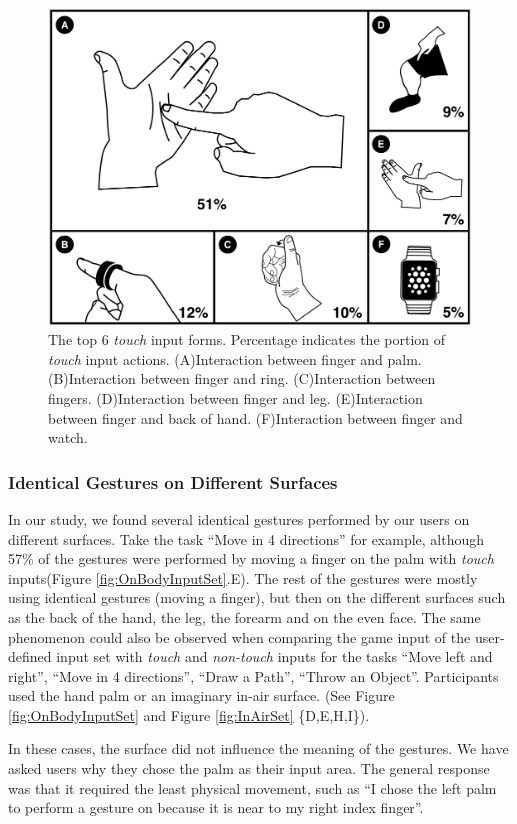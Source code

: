 \documentclass{sigchi}
\begin{document}
\begin{figure}[!t]
    \centering
    \includegraphics[width=0.8\columnwidth]{OnBodyForms.pdf}
    \caption{The top 6 \emph{touch} input forms. Percentage indicates the portion of \emph{touch} input actions. (A)Interaction between finger and palm. (B)Interaction between finger and ring. (C)Interaction between fingers. (D)Interaction between finger and leg. (E)Interaction between finger and back of hand. (F)Interaction between finger and watch.}
    \label{fig:figureOnBodyPorpotion}
    \end{figure}   

\subsubsection{Identical Gestures on Different Surfaces}
 In our study, we found several identical gestures performed by our users on different surfaces. Take the task ``Move in 4 directions'' for example, although 57\% of the gestures were performed by moving a finger on the palm with \emph{touch} inputs(Figure \ref{fig:OnBodyInputSet}.E). The rest of the gestures were mostly using identical gestures (moving a finger), but then on the different surfaces such as the back of the hand, the leg, the forearm and on the even face. The same phenomenon could also be observed when comparing the game input of the user-defined input set with \emph{touch} and \emph{non-touch} inputs for the tasks ``Move left and right'', ``Move in 4 directions'', ``Draw a Path'', ``Throw an Object''. Participants used the hand palm or an imaginary in-air surface. 
 (See Figure \ref{fig:OnBodyInputSet} and Figure \ref{fig:InAirSet} \{D,E,H,I\}). 

 In these cases, the surface did not influence the meaning of the gestures. We have asked users why they chose the palm as their input area. The general response was that it required the least physical movement, such as ``I chose the left palm to perform a gesture on because it is near to my right index finger''. 
\end{document}
